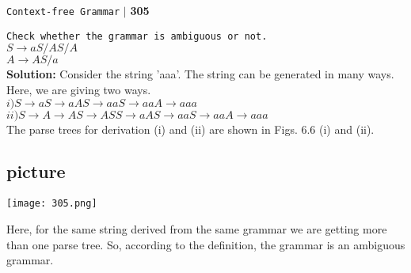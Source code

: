 \documentclass{article}
\begin{document}
\begin{flushright}
 \texttt{Context-free Grammar} \hspace*{0.10cm}\textbf{$|$} \textbf{305}\hspace*{0.5cm}
\end{flushright}

\vspace*{1cm}
\hspace*{0.1cm} \texttt{Check whether the grammar is ambiguous or not.}\\

\vspace*{0.3cm}
\hspace*{4cm} $S \rightarrow aS/AS/A$ \\
\hspace*{4cm} $A \rightarrow AS/a$ \\

\vspace*{0.5cm}
\textbf{Solution:} Consider the string 'aaa'. The string can be generated in many ways. Here, we are giving two
ways.\\
\vspace*{0.2cm}
\hspace*{0.5cm} $i) S \rightarrow aS \rightarrow aAS \rightarrow aaS \rightarrow aaA \rightarrow aaa$ \\
\hspace*{0.5cm} $ii) S \rightarrow A \rightarrow AS \rightarrow ASS \rightarrow aAS \rightarrow aaS \rightarrow aaA \rightarrow aaa$ \\


The parse trees for derivation (i) and (ii) are shown in Figs. 6.6 (i) and (ii).\\

\begin{center}
\section{picture}
\texttt{[image: 305.png]}
\end{center}

\hspace*{0.5cm} Here, for the same string derived from the same grammar we are getting more than one parse tree.
So, according to the definition, the grammar is an ambiguous grammar.\\

\vspace*{0.5cm}
\end{document}
